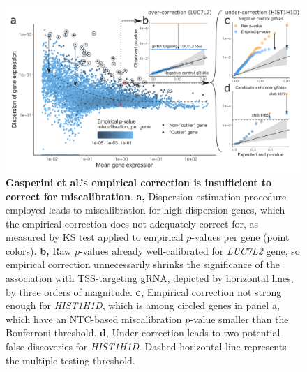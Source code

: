 \documentclass{article}
\begin{document}
\begin{figure}[h]
	\centering
	\includegraphics[width = \textwidth]{FigureS1.png}
	\caption{\textbf{Gasperini et al.'s empirical correction is insufficient to correct for miscalibration}. \textbf{a,} Dispersion estimation procedure employed leads to miscalibration for high-dispersion genes, which the empirical correction does not adequately correct for, as measured by KS test applied to empirical $p$-values per gene (point colors). \textbf{b,} Raw $p$-values already well-calibrated for \textit{LUC7L2} gene, so empirical correction unnecessarily shrinks the significance of the association with TSS-targeting gRNA, depicted by horizontal lines, by three orders of magnitude. \textbf{c,} Empirical correction not strong enough for \textit{HIST1H1D}, which is among circled genes in panel a, which have an NTC-based miscalibration $p$-value smaller than the Bonferroni threshold. \textbf{d}, Under-correction leads to two potential false discoveries for \textit{HIST1H1D}. Dashed horizontal line represents the multiple testing threshold.}
	\label{fig:gasp_correction}
\end{figure}

\clearpage
\end{document}
